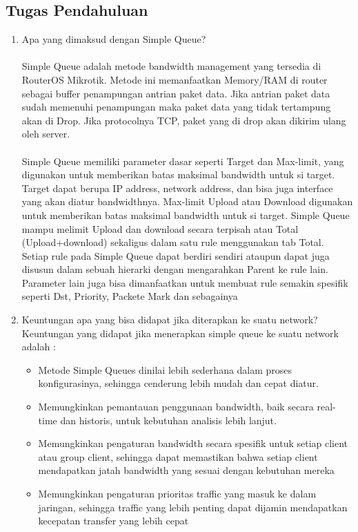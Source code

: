 \subsection{Tugas Pendahuluan}
\begin{enumerate}
	\item Apa yang dimaksud dengan Simple Queue? \\
	\\ \indent Simple Queue adalah metode bandwidth management yang tersedia di RouterOS Mikrotik. 
	Metode ini memanfaatkan Memory/RAM di router sebagai buffer penampungan antrian paket data. 
	Jika antrian paket data sudah memenuhi penampungan maka paket data yang tidak tertampung akan di Drop. 
	Jika protocolnya TCP, paket yang di drop akan dikirim ulang oleh server. 
	\\ \\ \indent Simple Queue memiliki parameter dasar seperti Target dan Max-limit, yang digunakan untuk memberikan batas maksimal bandwidth untuk si target. 
	Target dapat berupa IP address, network address, dan bisa juga interface yang akan diatur bandwidthnya. Max-limit Upload atau Download digunakan untuk memberikan batas maksimal bandwidth untuk si target. 
	Simple Queue mampu melimit Upload dan download secara terpisah atau Total (Upload+download) sekaligus dalam satu rule menggunakan tab Total. 
	Setiap rule pada Simple Queue dapat berdiri sendiri ataupun dapat juga disusun dalam sebuah hierarki dengan mengarahkan Parent ke rule lain. 
	Parameter lain juga bisa dimanfaatkan untuk membuat rule semakin spesifik seperti Dst, Priority, Packete Mark dan sebagainya

	\item Keuntungan apa yang bisa didapat jika diterapkan ke suatu network?
	\\ Keuntungan yang didapat jika menerapkan simple queue ke suatu network adalah : 
	\begin{itemize}
		\item[\ding{58}] Metode Simple Queues dinilai lebih sederhana dalam proses konfigurasinya, sehingga cenderung lebih mudah dan cepat diatur.
		\item[\ding{58}] Memungkinkan pemantauan penggunaan bandwidth, baik secara real-time dan historis, untuk kebutuhan analisis lebih lanjut.
		\item[\ding{58}] Memungkinkan pengaturan bandwidth secara spesifik untuk setiap client atau group client, sehingga dapat memastikan bahwa setiap client mendapatkan jatah bandwidth yang sesuai dengan kebutuhan mereka
		\item[\ding{58}] Memungkinkan pengaturan prioritas traffic yang masuk ke dalam jaringan, sehingga traffic yang lebih penting dapat dijamin mendapatkan kecepatan transfer yang lebih cepat 
	\end{itemize}

\end{enumerate}

